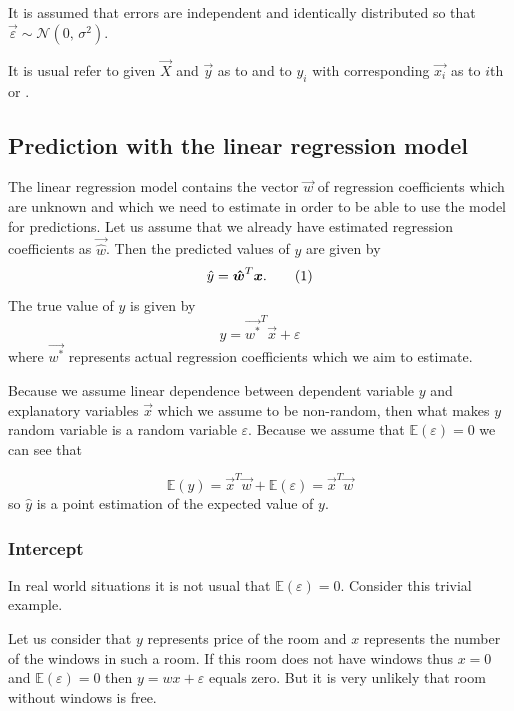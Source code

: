 It is assumed that errors are independent and identically distributed so that $\vec{\varepsilon} \sim \mathcal{N}(0,\,\sigma^{2})$.

\begin{note}
    It is usual refer to given $\vec{X}$ and $\vec{y}$ as to  and to $y_i$ with corresponding $\vec{x_i}$ as to $i$th  or .
\end{note}

\subsection{Prediction with the linear regression model}
The linear regression model contains the vector $\vec{w}$ of regression coefficients which are unknown and which we need to estimate in order to be able to use the model for predictions. Let us assume that we already have estimated regression coefficients as $\vec{\hat{w}}$. Then the predicted values of $y$ are given by
\begin{equation}
    \hat{y} = \vec{\hat{w}}^T\vec{x}. \numberthis
\end{equation}
The true value of $y$ is given by 
\begin{equation}
    y = \vec{w^{*}}^T\vec{x} + \varepsilon
\end{equation}
where $ \vec{w^{*}}$  represents actual regression coefficients which we aim to estimate. 

Because we assume linear dependence between dependent variable $y$ and explanatory variables $\vec{x}$ which we assume to be non-random, then what makes $y$ random variable is a random variable $\varepsilon$. Because we assume that $\mathbb{E}(\varepsilon) = 0$ we can see that 

\begin{equation} \label{equation:vary}
\mathbb{E}(y) = \vec{x}^T\vec{w} + \mathbb{E}(\varepsilon) = \vec{x}^T\vec{w}
\end{equation}
so $\hat{y}$ is a point estimation of the expected value of $y$.

\subsubsection*{Intercept}
In real world situations it is not usual that $\mathbb{E}(\varepsilon) = 0$. Consider this trivial example.
\begin{example} \label{example:intercept}
Let us consider that $y$ represents price of the room and $x$ represents the number of the windows in such a room. If this room does not have windows thus $x = 0$ and $\mathbb{E}(\varepsilon) = 0$ then $ y = wx + \varepsilon$ equals zero. But it is very unlikely that room without windows is free. 
\end{example}

